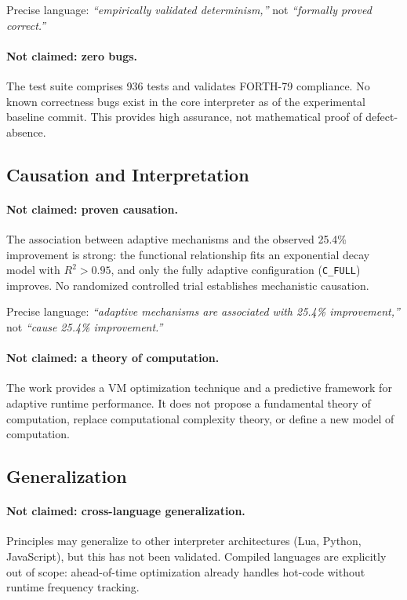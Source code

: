 Precise language: \emph{``empirically validated determinism,''} not
\emph{``formally proved correct.''}

\paragraph{Not claimed: zero bugs.}
The test suite comprises 936\raisebox{0.5ex}{+} tests and validates FORTH-79
compliance. No known correctness bugs exist in the core interpreter as of the
experimental baseline commit. This provides high assurance, not mathematical
proof of defect-absence.

\subsection{Causation and Interpretation}

\paragraph{Not claimed: proven causation.}
The association between adaptive mechanisms and the observed 25.4\%
improvement is strong: the functional relationship fits an exponential decay
model with $R^2 > 0.95$, and only the fully adaptive configuration
(\texttt{C\_FULL}) improves. No randomized controlled trial establishes
mechanistic causation.

Precise language: \emph{``adaptive mechanisms are associated with 25.4\%
improvement,''} not \emph{``cause 25.4\% improvement.''}

\paragraph{Not claimed: a theory of computation.}
The work provides a VM optimization technique and a predictive framework for
adaptive runtime performance. It does not propose a fundamental theory of
computation, replace computational complexity theory, or define a new model
of computation.

\subsection{Generalization}

\paragraph{Not claimed: cross-language generalization.}
Principles may generalize to other interpreter architectures (Lua, Python,
JavaScript), but this has not been validated. Compiled languages are
explicitly out of scope: ahead-of-time optimization already handles hot-code
without runtime frequency tracking.

